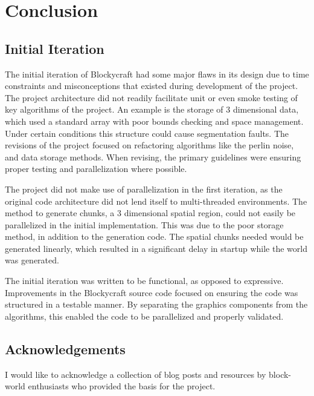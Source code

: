 \documentclass[a4paper,11pt,titlepage]{scrartcl}
\newcommand{\Blockycraft}{Blockycraft}
\begin{document}
\section{Conclusion}
\subsection{Initial Iteration}
The initial iteration of \Blockycraft{} had some major flaws in its design due to time constraints and misconceptions that existed during development of the project.  The project architecture did not readily facilitate unit or even smoke testing of key algorithms of the project.  An example is the storage of 3 dimensional data, which used a standard array with poor bounds checking and space management.  Under certain conditions this structure could cause segmentation faults.   The revisions of the project focused on refactoring algorithms like the perlin noise, and data storage methods.  When revising, the primary guidelines were ensuring proper testing and parallelization where possible. 

The project did not make use of parallelization in the first iteration, as the original code architecture did not lend itself to multi-threaded environments.  The method to generate chunks, a 3 dimensional spatial region, could not easily be parallelized in the initial implementation.  This was due to the poor storage method, in addition to the generation code.  The spatial chunks needed would be generated linearly, which resulted in a significant delay in startup while the world was generated.

The initial iteration was written to be functional, as opposed to expressive.  Improvements in the \Blockycraft{} source code focused on ensuring the code was structured in a testable manner.  By separating the graphics components from the algorithms, this enabled the code to be parallelized and properly validated.

\subsection{Acknowledgements}
I would like to acknowledge a collection of blog posts and resources by block-world enthusiasts who provided the basis for the project.
\end{document}
